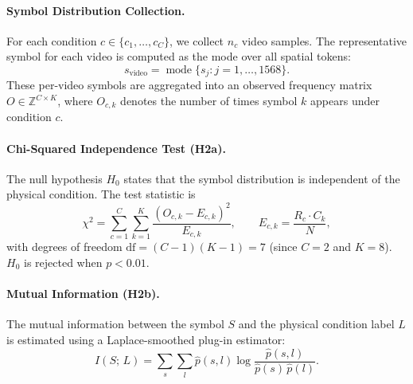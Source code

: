 \documentclass{article}
\begin{document}
\paragraph{Symbol Distribution Collection.}
For each condition $c \in \{c_1, \ldots, c_C\}$, we collect $n_c$ video
samples.  The representative symbol for each video is computed as the mode over
all spatial tokens:
%
\begin{equation}
  s_{\text{video}}
  = \operatorname{mode}\bigl\{s_j : j = 1, \ldots, 1568\bigr\}.
\end{equation}
%
These per-video symbols are aggregated into an observed frequency matrix
$O \in \mathbb{Z}^{C \times K}$, where $O_{c,k}$ denotes the number of times
symbol $k$ appears under condition $c$.

\paragraph{Chi-Squared Independence Test (H2a).}
The null hypothesis $H_0$ states that the symbol distribution is independent
of the physical condition.  The test statistic is
%
\begin{equation}
  \chi^2
  = \sum_{c=1}^{C}\sum_{k=1}^{K}
    \frac{(O_{c,k} - E_{c,k})^2}{E_{c,k}},
  \qquad
  E_{c,k} = \frac{R_c \cdot C_k}{N},
\end{equation}
%
with degrees of freedom $\mathrm{df} = (C-1)(K-1) = 7$ (since $C = 2$ and
$K = 8$).  $H_0$ is rejected when $p < 0.01$.

\paragraph{Mutual Information (H2b).}
The mutual information between the symbol $S$ and the physical condition label
$L$ is estimated using a Laplace-smoothed plug-in estimator:
%
\begin{equation}
  I(S;\,L)
  = \sum_{s}\sum_{l}
    \hat{p}(s,l)\log\frac{\hat{p}(s,l)}{\hat{p}(s)\,\hat{p}(l)}.
\end{equation}
\end{document}
